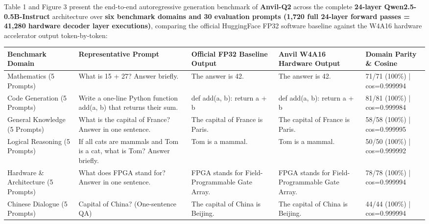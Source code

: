 \documentclass[11pt,a4paper]{article}
\begin{document}
Table 1 and Figure 3 present the end-to-end autoregressive generation benchmark of \textbf{Anvil-Q2} across the complete \textbf{24-layer Qwen2.5-0.5B-Instruct} architecture over \textbf{six benchmark domains and 30 evaluation prompts (1,720 full 24-layer forward passes = 41,280 hardware decoder layer executions)}, comparing the official HuggingFace FP32 software baseline against the W4A16 hardware accelerator output token-by-token:

{\footnotesize\renewcommand{\arraystretch}{1.14}\begin{longtable}{@{}L{0.16\textwidth}L{0.2\textwidth}L{0.19\textwidth}L{0.19\textwidth}L{0.16\textwidth}@{}}\toprule

\textbf{Benchmark Domain} & \textbf{Representative Prompt} & \textbf{Official FP32 Baseline Output} & \textbf{Anvil W4A16 Hardware Output} & \textbf{Domain Parity \& Cosine}\\\midrule\endhead

Mathematics (\allowbreak{}5 Prompts)\allowbreak{} & What is 15 +\allowbreak{} 27? Answer briefly. & The answer is 42. & The answer is 42. & 71/\allowbreak{}71 (\allowbreak{}100\%)\allowbreak{} | cos=\allowbreak{}0.999994\\[2pt]

Code Generation (\allowbreak{}5 Prompts)\allowbreak{} & Write a one-line Python function add(\allowbreak{}a,\allowbreak{} b)\allowbreak{} that returns their sum. & def add(\allowbreak{}a,\allowbreak{} b)\allowbreak{}:     return a +\allowbreak{} b & def add(\allowbreak{}a,\allowbreak{} b)\allowbreak{}:     return a +\allowbreak{} b & 81/\allowbreak{}81 (\allowbreak{}100\%)\allowbreak{} | cos=\allowbreak{}0.999984\\[2pt]

General Knowledge (\allowbreak{}5 Prompts)\allowbreak{} & What is the capital of France? Answer in one sentence. & The capital of France is Paris. & The capital of France is Paris. & 58/\allowbreak{}58 (\allowbreak{}100\%)\allowbreak{} | cos=\allowbreak{}0.999995\\[2pt]

Logical Reasoning (\allowbreak{}5 Prompts)\allowbreak{} & If all cats are mammals and Tom is a cat,\allowbreak{} what is Tom? Answer briefly. & Tom is a mammal. & Tom is a mammal. & 50/\allowbreak{}50 (\allowbreak{}100\%)\allowbreak{} | cos=\allowbreak{}0.999992\\[2pt]

Hardware \& Architecture (\allowbreak{}5 Prompts)\allowbreak{} & What does FPGA stand for? Answer in one sentence. & FPGA stands for Field-Programmable Gate Array. & FPGA stands for Field-Programmable Gate Array. & 78/\allowbreak{}78 (\allowbreak{}100\%)\allowbreak{} | cos=\allowbreak{}0.999994\\[2pt]

Chinese Dialogue (\allowbreak{}5 Prompts)\allowbreak{} & Capital of China? (\allowbreak{}One-sentence QA)\allowbreak{} & The capital of China is Beijing. & The capital of China is Beijing. & 44/\allowbreak{}44 (\allowbreak{}100\%)\allowbreak{} | cos=\allowbreak{}0.999994\\[2pt]

\bottomrule\end{longtable}}
\end{document}
